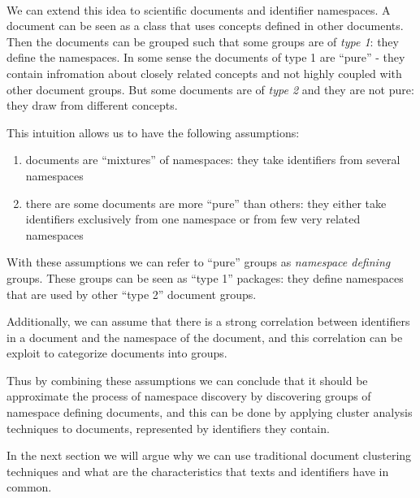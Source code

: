 \ \\

We can extend this idea to scientific documents and identifier
namespaces. A document can be seen as a class that uses concepts defined
in other documents. Then the documents can be grouped such that
some groups are of \emph{type 1}: they define the namespaces. In some
sense the documents of type 1 are ``pure'' - they contain infromation
about closely related concepts and not highly coupled
with other document groups. But some documents are of \emph{type 2} and they
are not pure: they draw from different concepts.


This intuition allows us to have the following assumptions:

\begin{enumerate}
 \item documents are ``mixtures'' of namespaces: they take identifiers from several namespaces
 \item there are some documents are more ``pure'' than others: they either take identifiers exclusively from one namespace or from few very related namespaces
\end{enumerate}


With these assumptions we can refer to ``pure'' groups as
\emph{namespace defining} groups. These groups can be seen as
``type 1'' packages: they define namespaces that are used by other
``type 2'' document groups.


Additionally, we can assume that there is a strong correlation
between identifiers in a document and the namespace of the document,
and this correlation can be exploit to categorize
documents into groups.




Thus by combining these assumptions we can conclude that it should
be approximate the process of namespace discovery by discovering
groups of namespace defining documents, and this can be done by
applying cluster analysis techniques to documents, represented
by identifiers they contain.

In the next section we will argue why we can use traditional
document clustering techniques and what are the characteristics
that texts and identifiers have in common.


